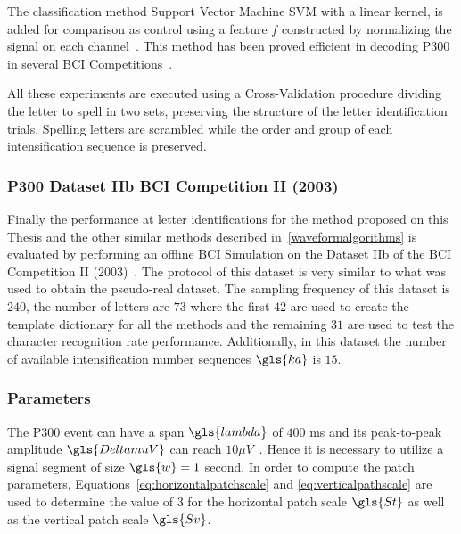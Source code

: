 The classification method Support Vector Machine SVM with a linear kernel, is added for comparison as control using a feature $f$ constructed by normalizing the signal on each channel~\cite{Krusienski2006}.  This method has been proved efficient in decoding P300 in several BCI Competitions~\cite{Kaper2004}. 

All these experiments are executed using a Cross-Validation procedure dividing the letter to spell in two sets, preserving the structure of the letter identification trials. Spelling letters are scrambled while the order and group of each intensification sequence is preserved.

\subsubsection{P300 Dataset IIb BCI Competition II (2003)}

Finally the performance at letter identifications for the method proposed on this Thesis and the other similar methods described in~\ref{waveformalgorithms} is evaluated by performing an offline BCI Simulation on the Dataset IIb of the BCI Competition II (2003)~\cite{Blankertz2002}.  The protocol of this dataset is very similar to what was used to obtain the pseudo-real dataset.  The sampling frequency of this dataset is $240$, the number of letters are $73$ where the first $42$ are used to create the template dictionary for all the methods and the remaining $31$ are used to test the character recognition rate performance.  Additionally, in this dataset the number of available intensification number sequences $\gls{ka}$ is $15$.  


\subsubsection{Parameters}

The P300 event can have a span $\gls{lambda}$ of $400$ ms and its peak-to-peak amplitude $\gls{DeltamuV}$ can reach $ 10 \mu V $~\cite{Rao2013}.  Hence it is necessary to utilize a signal segment of size $\gls{w} = 1$ second.  In order to compute the patch parameters, Equations~\ref{eq:horizontalpatchscale} and \ref{eq:verticalpathscale} are used to determine the value of $3$ for the horizontal patch scale $\gls{St}$ as well as the vertical patch scale $\gls{Sv}$. 


%

